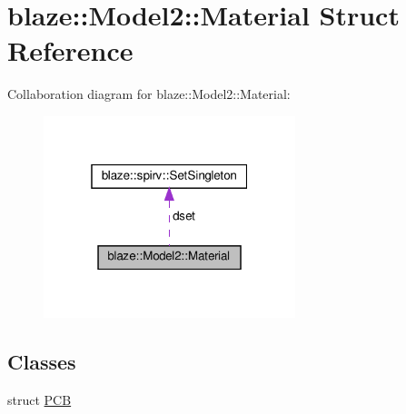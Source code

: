 \hypertarget{structblaze_1_1Model2_1_1Material}{}\section{blaze\+:\+:Model2\+:\+:Material Struct Reference}
\label{structblaze_1_1Model2_1_1Material}


Collaboration diagram for blaze\+:\+:Model2\+:\+:Material\+:\nopagebreak
\begin{figure}[H]
\begin{center}
\leavevmode
\includegraphics[width=208pt]{structblaze_1_1Model2_1_1Material__coll__graph}
\end{center}
\end{figure}
\subsection*{Classes}
\begin{DoxyCompactItemize}
\item 
struct \hyperlink{structblaze_1_1Model2_1_1Material_1_1PCB}{P\+CB}
\end{DoxyCompactItemize}
